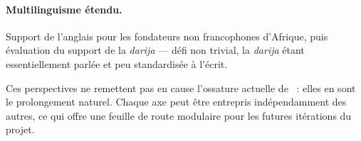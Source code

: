 \paragraph{Multilinguisme étendu.} Support de l'anglais pour les fondateurs non francophones d'Afrique, puis évaluation du support de la \textit{darija} --- défi non trivial, la \textit{darija} étant essentiellement parlée et peu standardisée à l'écrit.

\vspace{0.3cm}
\begin{success}
Ces perspectives ne remettent pas en cause l'ossature actuelle de \tamwil{}~: elles en sont le prolongement naturel. Chaque axe peut être entrepris indépendamment des autres, ce qui offre une feuille de route modulaire pour les futures itérations du projet.
\end{success}
